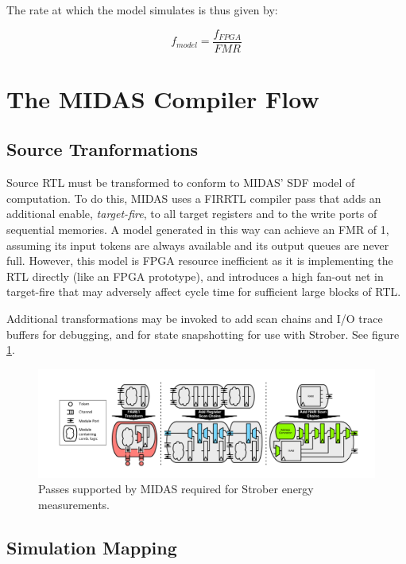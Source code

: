 \noindent The rate at which the model simulates is thus given by:

$$ f_{model} = \frac{f_{FPGA}}{FMR} $$

\section{The MIDAS Compiler Flow}

\subsection{Source Tranformations}\label{sec:source-transformations}

Source RTL must be transformed to conform to MIDAS' SDF model of computation.
To do this, MIDAS uses a FIRRTL compiler pass that adds an additional enable,
\emph{target-fire}, to all target registers and to the write ports of
sequential memories. A model generated in this way can achieve an FMR of 1,
assuming its input tokens are always available and its output queues are never
full.  However, this model is FPGA resource inefficient as it is implementing
the RTL directly (like an FPGA prototype), and introduces a high fan-out net in
target-fire that may adversely affect cycle time for sufficient large blocks of
RTL.

Additional transformations may be invoked to add scan chains and I/O trace
buffers for debugging, and for state snapshotting for use with
Strober\cite{strober}. See figure \ref{fig:midas-passes}.

\begin{figure}
	\centering
	\includegraphics[width=16cm]{figures/midas-passes.pdf}
	\caption{Passes supported by MIDAS required for Strober energy measurements.}
	\label{fig:midas-passes}
	\centering
\end{figure}

\subsection{Simulation Mapping}

